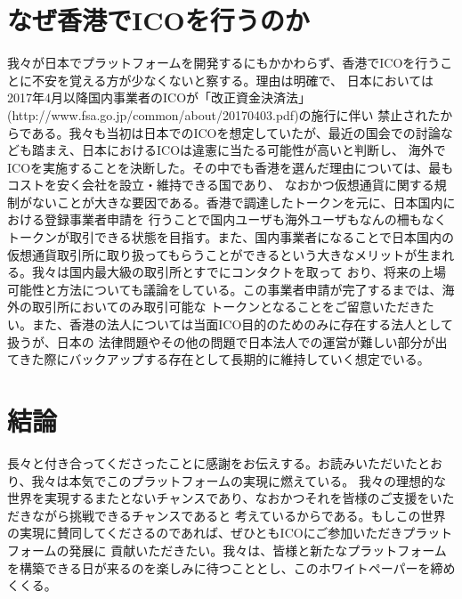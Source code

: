 \documentclass{jsarticle}
\begin{document}
\section{なぜ香港でICOを行うのか}
我々が日本でプラットフォームを開発するにもかかわらず、香港でICOを行うことに不安を覚える方が少なくないと察する。理由は明確で、
日本においては2017年4月以降国内事業者のICOが「改正資金決済法」(http://www.fsa.go.jp/common/about/20170403.pdf)の施行に伴い
禁止されたからである。我々も当初は日本でのICOを想定していたが、最近の国会での討論なども踏まえ、日本におけるICOは違憲に当たる可能性が高いと判断し、
海外でICOを実施することを決断した。その中でも香港を選んだ理由については、最もコストを安く会社を設立・維持できる国であり、
なおかつ仮想通貨に関する規制がないことが大きな要因である。香港で調達したトークンを元に、日本国内における登録事業者申請を
行うことで国内ユーザも海外ユーザもなんの柵もなくトークンが取引できる状態を目指す。また、国内事業者になることで日本国内の
仮想通貨取引所に取り扱ってもらうことができるという大きなメリットが生まれる。我々は国内最大級の取引所とすでにコンタクトを取って
おり、将来の上場可能性と方法についても議論をしている。この事業者申請が完了するまでは、海外の取引所においてのみ取引可能な
トークンとなることをご留意いただきたい。また、香港の法人については当面ICO目的のためのみに存在する法人として扱うが、日本の
法律問題やその他の問題で日本法人での運営が難しい部分が出てきた際にバックアップする存在として長期的に維持していく想定でいる。
\section{結論}
長々と付き合ってくださったことに感謝をお伝えする。お読みいただいたとおり、我々は本気でこのプラットフォームの実現に燃えている。
我々の理想的な世界を実現するまたとないチャンスであり、なおかつそれを皆様のご支援をいただきながら挑戦できるチャンスであると
考えているからである。もしこの世界の実現に賛同してくださるのであれば、ぜひともICOにご参加いただきプラットフォームの発展に
貢献いただきたい。我々は、皆様と新たなプラットフォームを構築できる日が来るのを楽しみに待つこととし、このホワイトペーパーを締めくくる。
\end{document}
